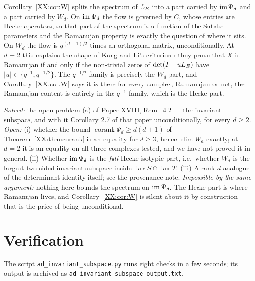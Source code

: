 \begin{remark}\label{XX:rem:split}
Corollary~\ref{XX:cor:W} splits the spectrum of $L_E$ into a part carried by $\operatorname{im}\Psi_d$ and a
part carried by $W_d$. On $\operatorname{im}\Psi_d$ the flow is governed by $C$, whose entries are Hecke
operators, so that part of the spectrum is a function of the Satake parameters and the
Ramanujan property is exactly the question of where it sits. On $W_d$ the flow is
$q^{(d-1)/2}$ times an orthogonal matrix, unconditionally. At $d=2$ this explains the shape
of Kang and Li's criterion \cite[Thm.~1.0.2]{KL14}: they prove that $X$ is Ramanujan if and
only if the non-trivial zeros of $\det(I-uL_E)$ have $|u|\in\{q^{-1},q^{-1/2}\}$. The
$q^{-1/2}$ family is precisely the $W_d$ part, and Corollary~\ref{XX:cor:W} says it is there for
every complex, Ramanujan or not; the Ramanujan content is entirely in the $q^{-1}$ family,
which is the Hecke part.
\end{remark}

\begin{remark}\label{XX:rem:soi}
\emph{Solved:} the open problem (a) of Paper XVIII, Rem.~4.2 --- the invariant subspace, and
with it Corollary 2.7 of that paper unconditionally, for every $d\ge2$.
\emph{Open:} (i) whether the bound $\operatorname{corank}\Psi_d\ge d(d+1)$ of
Theorem~\ref{XX:thm:corank} is an equality for $d\ge3$, hence $\dim W_d$ exactly; at $d=2$ it is
an equality on all three complexes tested, and we have not proved it in general.
(ii) Whether $\operatorname{im}\Psi_d$ is the \emph{full} Hecke-isotypic part, i.e.\ whether $W_d$ is the
largest two-sided invariant subspace inside $\ker S\cap\ker T$.
(iii) A rank-$d$ analogue of the determinant identity itself; see the provenance note.
\emph{Impossible by the same argument:} nothing here bounds the spectrum on $\operatorname{im}\Psi_d$. The
Hecke part is where Ramanujan lives, and Corollary~\ref{XX:cor:W} is silent about it by
construction --- that is the price of being unconditional.
\end{remark}

\section{Verification}

The script \texttt{ad\_invariant\_subspace.py} runs eight checks in a few seconds; its
output is archived as \texttt{ad\_invariant\_subspace\_output.txt}.

